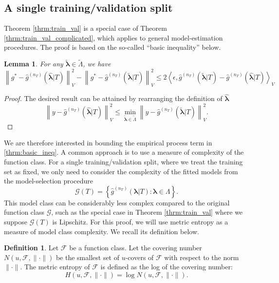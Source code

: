 \documentclass[10pt]{book}
\newtheorem{lemma}{Lemma}
\theoremstyle{definition}
\newtheorem{definition}{Definition}
\begin{document}
\subsection{A single training/validation split}
\label{appendix:train_val}

Theorem \ref{thrm:train_val} is a special case of Theorem \ref{thrm:train_val_complicated}, which applies to general model-estimation procedures. The proof is based on the so-called ``basic inequality'' below.

\begin{lemma}
	For any $\tilde{\boldsymbol{\lambda}} \in \tilde{\Lambda}$, we have
	\begin{equation}
	\label{thrm:basic_ineq}
	\left \| g^* - \hat{g}^{(n_T)}(\hat{\boldsymbol{\lambda}}|T) \right \|^2_V 
	- \left \| g^* - \hat{g}^{(n_T)}(\tilde{\boldsymbol{\lambda}}|T) \right \|^2_V
	\le 
	2 \left \langle \epsilon, \hat{g}^{(n_T)}(\tilde{\boldsymbol{\lambda}}|T) - \hat{g}^{(n_T)}(\hat{\boldsymbol{\lambda}}|T) \right \rangle_V
	\end{equation}
\end{lemma}

\begin{proof}
	The desired result can be attained by rearranging the definition of $\hat{\boldsymbol{\lambda}}$
	\begin{equation}
	\left \| y - \hat{g}^{(n_T)}(\hat{\boldsymbol{\lambda}}|T) \right \|^2_V \le
	\min_{\tilde{\boldsymbol{\lambda}} \in \tilde{\Lambda}} \left \| y - \hat{g}^{(n_T)}(\tilde{\boldsymbol{\lambda}}|T) \right \|^2_V.
	\end{equation}
\end{proof}

We are therefore interested in bounding the empirical process term in \eqref{thrm:basic_ineq}. A common approach is to use a measure of complexity of the function class. For a single training/validation split, where we treat the training set as fixed, we only need to consider the complexity of the fitted models from the model-selection procedure
\begin{equation}
\mathcal{G}(T)=\left\{ \hat{g}^{(n_T)}(\boldsymbol{\lambda}|T) : \boldsymbol{\lambda} \in \Lambda \right\}.
\end{equation}
This model class can be considerably less complex compared to the original function class $\mathcal{G}$, such as the special case in Theorem \ref{thrm:train_val} where we suppose $\mathcal{G}(T)$ is Lipschitz. For this proof, we will use metric entropy as a measure of model class complexity. We recall its definition below.
\begin{definition}
	Let $\mathcal{F}$ be a function class. Let the covering number $N(u, \mathcal{F}, \| \cdot \|)$ be the smallest set of $u$-covers of $\mathcal{F}$ with respect to the norm $\| \cdot \|$. The metric entropy of $\mathcal{F}$ is defined as the log of the covering number:
	\begin{equation}
	H (u, \mathcal{F}, \| \cdot \| ) = \log N(u, \mathcal{F}, \| \cdot \|).
	\end{equation}
\end{definition}
\end{document}
